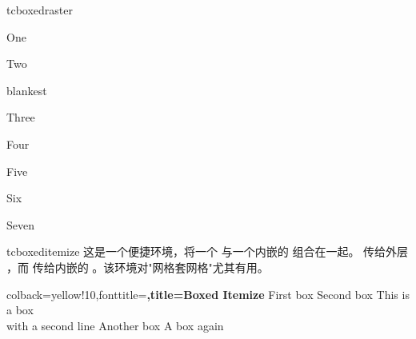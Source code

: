 \begin{docEnvironment}[doc new=2016-02-19]{tcboxedraster}{}
\begin{dispExample}
\begin{tcbraster}[raster columns=2, raster equal height,
  raster every box/.style={size=small,colframe=red!50!black,colback=red!10!white,
    valign=center,halign=center}]
  \begin{tcolorbox}One\end{tcolorbox}
  \begin{tcolorbox}Two\end{tcolorbox}
    \begin{tcboxedraster}{blankest}
      \begin{tcolorbox}Three\end{tcolorbox}
      \begin{tcolorbox}Four\end{tcolorbox}
      \begin{tcolorbox}Five\end{tcolorbox}
      \begin{tcolorbox}Six\end{tcolorbox}
    \end{tcboxedraster}
    \begin{tcolorbox}Seven\end{tcolorbox}
\end{tcbraster}
\end{dispExample}
\end{docEnvironment}


\clearpage
\begin{docEnvironment}[doc new=2016-04-27]{tcboxeditemize}{}
  这是一个便捷环境，将一个  与一个内嵌的
   组合在一起。 传给外层
  ，而  传给内嵌的
  。该环境对"网格套网格"尤其有用。

\begin{dispExample}
\begin{tcboxeditemize}[raster columns=3, raster equal height,
  size=small,colframe=red!50!black,colback=red!10!white,colbacktitle=red!50!white,
  title={Box \# \thetcbrasternum}]
  {colback=yellow!10,fonttitle=\bfseries,title=Boxed Itemize}
  \tcbitem First box
  \tcbitem Second box
  \tcbitem This is a box\\with a second line
  \tcbitem Another box
  \tcbitem A box again
\end{tcboxeditemize}
\end{dispExample}
\end{docEnvironment}


